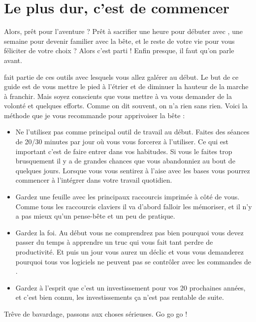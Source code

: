 \section{Le plus dur, c'est de commencer}

Alors, prêt pour l'aventure ? Prêt à sacrifier une heure pour débuter avec \vim, une semaine pour devenir familier avec la bête, et le reste de votre vie pour vous féliciter de votre choix ? Alors c'est parti ! Enfin presque, il faut qu'on parle avant.

\vim fait partie de ces outils avec lesquels vous allez galérer au début. Le but de ce guide est de vous mettre le pied à l'étrier et de diminuer la hauteur de la marche à franchir. Mais soyez conscients que vous mettre à \vim va vous demander de la volonté et quelques efforts. Comme on dit souvent, on n'a rien sans rien. Voici la méthode que je vous recommande pour apprivoiser la bête :

\begin{itemize}
    \item Ne l'utilisez pas comme principal outil de travail au début. Faites des séances de 20/30 minutes par jour où vous vous forcerez à l'utiliser. Ce qui est important c'est de faire entrer \vim dans vos habitudes. Si vous le faites trop brusquement il y a de grandes chances que vous abandonniez au bout de quelques jours. Lorsque vous vous sentirez à l'aise avec les bases vous pourrez commencer à l'intégrer dans votre travail quotidien.
    \item Gardez une feuille avec les principaux raccourcis imprimée à côté de vous. Comme tous les raccourcis claviers il va d'abord falloir les mémoriser, et il n'y a pas mieux qu'un pense-bête et un peu de pratique.
    \item Gardez la foi. Au début vous ne comprendrez pas bien pourquoi vous devez passer du temps à apprendre un truc qui vous fait tant perdre de productivité. Et puis un jour vous aurez un déclic et vous vous demanderez pourquoi tous vos logiciels ne peuvent pas se contrôler avec les commandes de \vim.
    \item Gardez à l'esprit que c'est un investissement pour vos 20 prochaines années, et c'est bien connu, les investissements ça n'est pas rentable de suite.
\end{itemize}

\bigskip

Trêve de bavardage, passons aux choses sérieuses. Go go go !
